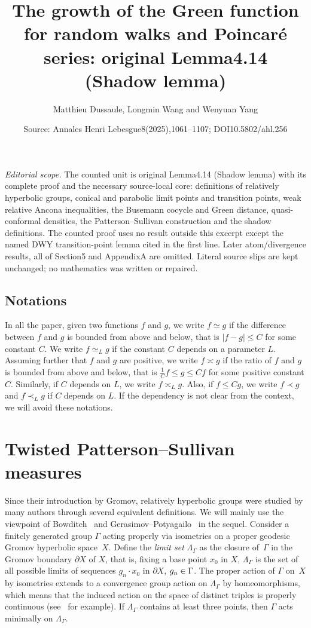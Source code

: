 \documentclass[10pt,a4paper]{amsart}
\title[Twisted partial-shadow bounds]{The growth of the Green function for random walks and Poincaré series: original Lemma4.14 (Shadow lemma)}
\author{Matthieu Dussaule, Longmin Wang and Wenyuan Yang}
\date{Source: Annales Henri Lebesgue8(2025),1061--1107; DOI10.5802/ahl.256}
\let\oldin\in
\renewcommand{\in}{\mathchoice{\oldin}{\oldin}{\,\oldin\,}{\,\oldin\,}}
\theoremstyle{definition}\newtheorem{defi}[theo]{Definition}
\begin{document}
\maketitle
\noindent\textit{Editorial scope.} The counted unit is original Lemma4.14 (Shadow lemma) with its complete proof and the necessary source-local core: definitions of relatively hyperbolic groups, conical and parabolic limit points and transition points, weak relative Ancona inequalities, the Busemann cocycle and Green distance, quasi-conformal densities, the Patterson--Sullivan construction and the shadow definitions. The counted proof uses no result outside this excerpt except the named DWY transition-point lemma cited in the first line. Later atom/divergence results, all of Section5 and AppendixA are omitted. Literal source slips are kept unchanged; no mathematics was written or repaired.
\subsection*{Notations}
In all the paper, given two functions $f$ and $g$, we write $f\simeq g$ if the difference between $f$ and $g$ is bounded from above and below, that is $|f-g|\leq C$ for some constant $C$. We write $f\simeq_L g$ if the constant $C$ depends on a parameter $L$. Assuming further that $f$ and $g$ are positive, we write $f\asymp g$ if the ratio of $f$ and $g$ is bounded\pagebreak{} from above and below, that is $\frac{1}{C}f\leq g\leq Cf$ for some positive constant $C$. Similarly, if $C$ depends on $L$, we write $f\asymp_L g$. Also, if $f\leq Cg$, we write $f\prec g$ and $f\prec_L g$ if $C$ depends on $L$. If the dependency is not clear from the context, we will avoid these notations.

\setcounter{section}{3}
\section{Twisted Patterson--Sullivan measures}
\label{Sectionpattersonsullivan}

Since their introduction by Gromov, relatively hyperbolic groups were studied by many authors through several equivalent definitions. We will mainly use the viewpoint of Bowditch~\cite{Bowditch} and Gerasimov--Potyagailo~\cite{GePoJEMS,GePoGGD,GP16} in the sequel. Consider a finitely generated group $\Gamma$ acting properly via isometries on a proper geodesic Gromov hyperbolic space~$X$. Define the \emph{limit set} $\Lambda_\Gamma$ as the closure of~$\Gamma$ in the Gromov boundary $\partial X$ of $X$, that is, fixing a base point $x_0$ in $X$, $\Lambda_\Gamma$ is the set of all possible limits of sequences $g_n\cdot x_0$ in $\partial X$, $g_n\in \Gamma$. The proper action of $\Gamma$ on~$X$ by isometries extends to a convergence group action on $\Lambda_\Gamma$ by homeomorphisms, which means that the induced action on the space of distinct triples is properly continuous (see~\cite[Proposition~1.11]{Bo99} for example). If $\Lambda_\Gamma$ contains at least three points, then $\Gamma$ acts minimally on $\Lambda_\Gamma$.
\end{document}
